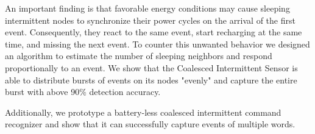 \documentclass[sigconf, anonymous]{acmart}
\newcommand{\fullsys}{Coalesced Intermittent Sensor\xspace}
\newcommand{\fullcim}{coalesced intermittent command recognizer\xspace}
\begin{document}
An important finding is that favorable energy conditions may cause sleeping intermittent nodes to synchronize their power cycles on the arrival of the first event. Consequently, they react to the same event, start recharging at the same time, and missing the next event. To counter this unwanted behavior we designed an algorithm to estimate the number of sleeping neighbors and respond proportionally to an event. We show that the \fullsys is able to distribute bursts of events on its nodes "evenly" and capture the entire burst with above 90\% detection accuracy.
 
Additionally, we prototype a battery-less \fullcim and show that it can successfully capture events of multiple words. 



\end{document}
